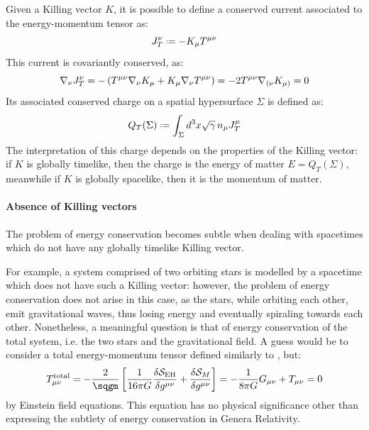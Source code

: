 Given a Killing vector $ K $, it is possible to define a conserved current associated to the energy-momentum tensor as:
\begin{equation}
  J_T^\nu \defeq - K_\mu T^{\mu \nu}
\end{equation}
This current is covariantly conserved, as:
\begin{equation*}
  \nabla_\nu J_T^\nu = - \left( T^{\mu \nu} \nabla_\nu K_\mu + K_\mu \nabla_\nu T^{\mu \nu} \right) = - 2 T^{\mu \nu} \nabla_{(\nu} K_{\mu)} = 0
\end{equation*}
Its associated conserved charge on a spatial hypersurface $ \Sigma $ is defined as:
\begin{equation}
  Q_T(\Sigma) \defeq \int_\Sigma d^3 x \sqrt{\gamma}\, n_\mu J_T^\mu
\end{equation}
The interpretation of this charge depends on the properties of the Killing vector: if $ K $ is globally timelike, then the charge is the energy of matter $ E = Q_T(\Sigma) $, meanwhile if $ K $ is globally spacelike, then it is the momentum of matter.

\paragraph{Absence of Killing vectors}

The problem of energy conservation becomes subtle when dealing with spacetimes which do not have any globally timelike Killing vector.

For example, a system comprised of two orbiting stars is modelled by a spacetime which does not have such a Killing vector: however, the problem of energy conservation does not arise in this case, as the stars, while orbiting each other, emit gravitational waves, thus losing energy and eventually spiraling towards each other. Nonetheless, a meaningful question is that of energy conservation of the total system, i.e. the two stars and the gravitational field. A guess would be to consider a total energy-momentum tensor defined similarly to , but:
\begin{equation*}
  T^{\text{total}}_{\mu \nu} = - \frac{2}{\sqgm} \left[ \frac{1}{16\pi G} \frac{\delta \mathcal{S}_{\text{EH}}}{\delta g^{\mu \nu}} + \frac{\delta \mathcal{S}_M}{\delta g^{\mu \nu}} \right] = - \frac{1}{8\pi G} G_{\mu \nu} + T_{\mu \nu} = 0
\end{equation*}
by Einstein field equations. This equation has no physical significance other than expressing the subtlety of energy conservation in Genera Relativity.

